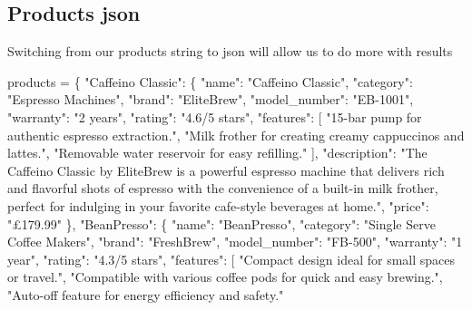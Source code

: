 \documentclass[
  letterpaper,
  DIV=11,
  numbers=noendperiod]{scrreprt}
\newenvironment{Shaded}{\begin{snugshade}}{\end{snugshade}}
\newcommand{\NormalTok}[1]{\textcolor[rgb]{0.00,0.23,0.31}{#1}}
\newcommand{\OperatorTok}[1]{\textcolor[rgb]{0.37,0.37,0.37}{#1}}
\newcommand{\StringTok}[1]{\textcolor[rgb]{0.13,0.47,0.30}{#1}}
\begin{document}
\hypertarget{products-json}{%
\subsection{Products json}\label{products-json}}

Switching from our products string to json will allow us to do more with
results

\begin{Shaded}
\begin{Highlighting}[]
\NormalTok{products }\OperatorTok{=}\NormalTok{ \{}
    \StringTok{"Caffeino Classic"}\NormalTok{: \{}
      \StringTok{"name"}\NormalTok{: }\StringTok{"Caffeino Classic"}\NormalTok{,}
      \StringTok{"category"}\NormalTok{: }\StringTok{"Espresso Machines"}\NormalTok{,}
      \StringTok{"brand"}\NormalTok{: }\StringTok{"EliteBrew"}\NormalTok{,}
      \StringTok{"model\_number"}\NormalTok{: }\StringTok{"EB{-}1001"}\NormalTok{,}
      \StringTok{"warranty"}\NormalTok{: }\StringTok{"2 years"}\NormalTok{,}
      \StringTok{"rating"}\NormalTok{: }\StringTok{"4.6/5 stars"}\NormalTok{,}
      \StringTok{"features"}\NormalTok{: [}
        \StringTok{"15{-}bar pump for authentic espresso extraction."}\NormalTok{,}
        \StringTok{"Milk frother for creating creamy cappuccinos and lattes."}\NormalTok{,}
        \StringTok{"Removable water reservoir for easy refilling."}
\NormalTok{      ],}
      \StringTok{"description"}\NormalTok{: }\StringTok{"The Caffeino Classic by EliteBrew is a powerful espresso machine that delivers rich and flavorful shots of espresso with the convenience of a built{-}in milk frother, perfect for indulging in your favorite cafe{-}style beverages at home."}\NormalTok{,}
      \StringTok{"price"}\NormalTok{: }\StringTok{"£179.99"}
\NormalTok{    \},}
    \StringTok{"BeanPresso"}\NormalTok{: \{}
      \StringTok{"name"}\NormalTok{: }\StringTok{"BeanPresso"}\NormalTok{,}
      \StringTok{"category"}\NormalTok{: }\StringTok{"Single Serve Coffee Makers"}\NormalTok{,}
      \StringTok{"brand"}\NormalTok{: }\StringTok{"FreshBrew"}\NormalTok{,}
      \StringTok{"model\_number"}\NormalTok{: }\StringTok{"FB{-}500"}\NormalTok{,}
      \StringTok{"warranty"}\NormalTok{: }\StringTok{"1 year"}\NormalTok{,}
      \StringTok{"rating"}\NormalTok{: }\StringTok{"4.3/5 stars"}\NormalTok{,}
      \StringTok{"features"}\NormalTok{: [}
        \StringTok{"Compact design ideal for small spaces or travel."}\NormalTok{,}
        \StringTok{"Compatible with various coffee pods for quick and easy brewing."}\NormalTok{,}
        \StringTok{"Auto{-}off feature for energy efficiency and safety."}

\end{Highlighting}
\end{Shaded}
\end{document}
